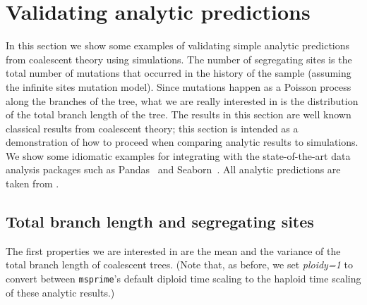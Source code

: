 \documentclass[graybox]{svmult}
\newcommand{\msprime}[0]{\texttt{msprime}}
\newcommand{\tskit}[0]{\texttt{tskit}}
\begin{document}


\section{Validating analytic predictions}\label{validating-analytical-predictions}

In this section we show some examples of validating simple analytic
predictions from coalescent theory using simulations. The number of
segregating sites is the total number of mutations that occurred in the
history of the sample (assuming the infinite sites mutation model).
Since mutations happen as a Poisson process along the branches of the
tree, what we are really interested in is the distribution of the total
branch length of the tree. The results in this section are well known
classical results from coalescent theory; this section is intended as a
demonstration of how to proceed when comparing analytic results to
simulations. We show some idiomatic examples for integrating with
the state-of-the-art data analysis packages such
as Pandas~\citep{mckinney2010data} and Seaborn~\citep{michael_waskom_2017_883859}.
All analytic predictions are taken from \cite{wakely2008coalescent}.

\subsection{Total branch length and segregating sites}
The first properties we are interested in are the mean and the
variance of the total branch length of coalescent trees. (Note that, as
before, we set \emph{ploidy=1} to convert between \msprime's default diploid time
scaling to the haploid time scaling of these analytic results.)
\end{document}
